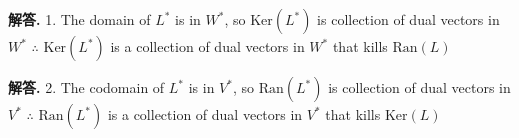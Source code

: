 \documentclass[12pt, a4paper, oneside]{article}
\newenvironment{solution}{\par\noindent\textbf{解答. }}{\par}
\begin{document}
\begin{CJK}{UTF8}{gbsn}
\begin{solution}
  1. \newline
  The domain of $L^*$ is in $W^*$, so $\text{Ker}(L^*)$ is collection of dual vectors in $W^*$ \newline
  $\therefore$ $\text{Ker}(L^*)$ is a collection of dual vectors in $W^*$ that kills $\text{Ran}(L)$
\end{solution}

\begin{solution}
  2. \newline
  The codomain of $L^*$ is in $V^*$, so $\text{Ran}(L^*)$ is collection of dual vectors in $V^*$ \newline
  $\therefore$ $\text{Ran}(L^*)$ is a collection of dual vectors in $V^*$ that kills $\text{Ker}(L)$
\end{solution}

\end{CJK}
\end{document}
